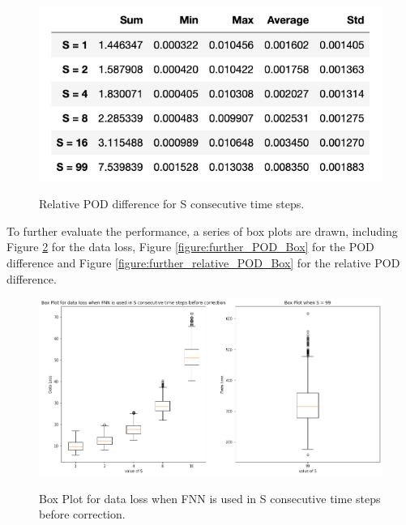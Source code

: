 \begin{figure}[H]
    \caption{Relative POD difference for S consecutive time steps.}
    \includegraphics[scale=0.7]{figures/mantle_convection_images/further_testings/Relative_POD_table.png}
    \label{figure:further_relative_POD}
\end{figure}

To further evaluate the performance, a series of box plots are drawn, including Figure \ref{figure:further_loss_Box} for the data loss, Figure \ref{figure:further_POD_Box} for the POD difference and Figure \ref{figure:further_relative_POD_Box} for the relative POD difference.

\begin{figure}[H]
    \caption{Box Plot for data loss when FNN is used in S consecutive time steps before correction.}
    \includegraphics[scale=0.4]{figures/mantle_convection_images/further_testings/Data_Loss_boxplot.png}
    \label{figure:further_loss_Box}
\end{figure}

